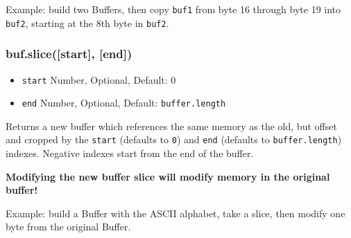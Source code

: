 Example: build two Buffers, then copy \texttt{buf1} from byte 16 through
byte 19 into \texttt{buf2}, starting at the 8th byte in \texttt{buf2}.

\begin{Shaded}
\begin{Highlighting}[]
 \NormalTok{(}\NormalTok{);}
 \NormalTok{(}\NormalTok{);}

 \NormalTok{(}   
  \NormalTok{; }
  \NormalTok{; }
\NormalTok{\}}

\NormalTok{, }\NormalTok{, }\NormalTok{);}
\NormalTok{(}\NormalTok{(}\NormalTok{, }\NormalTok{, }\NormalTok{));}

\end{Highlighting}
\end{Shaded}

\subsubsection{buf.slice({[}start{]},
{[}end{]})}\label{buf.slicestart-end}

\begin{itemize}
\itemsep1pt\parskip0pt
\item
  \texttt{start} Number, Optional, Default: 0
\item
  \texttt{end} Number, Optional, Default: \texttt{buffer.length}
\end{itemize}

Returns a new buffer which references the same memory as the old, but
offset and cropped by the \texttt{start} (defaults to \texttt{0}) and
\texttt{end} (defaults to \texttt{buffer.length}) indexes. Negative
indexes start from the end of the buffer.

\textbf{Modifying the new buffer slice will modify memory in the
original buffer!}

Example: build a Buffer with the ASCII alphabet, take a slice, then
modify one byte from the original Buffer.

